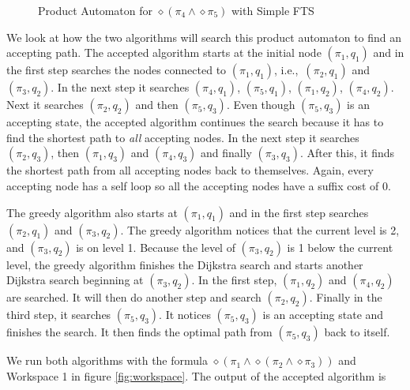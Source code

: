 \begin{figure}
\caption{Product Automaton for $\diamond (\pi_4 \wedge \diamond \pi_5)$ with Simple FTS}
\label{fig:Sequencing}
\end{figure}

We look at how the two algorithms will search this product automaton to find an accepting path. The accepted algorithm starts at the initial node $(\pi_1,q_1)$ and in the first step searches the nodes connected to $(\pi_1,q_1)$, i.e.,\ $(\pi_2,q_1)$ and $(\pi_3,q_2)$. In the next step it searches $(\pi_4,q_1)$, $(\pi_5,q_1)$, $(\pi_1,q_2)$, $(\pi_4,q_2)$. Next it searches $(\pi_2,q_2)$ and then $(\pi_5,q_3)$. Even though $(\pi_5,q_3)$ is an accepting state, the accepted algorithm continues the search because it has to find the shortest path to \textit{all} accepting nodes. In the next step it searches $(\pi_2,q_3)$, then $(\pi_1,q_3)$ and $(\pi_4,q_3)$ and finally $(\pi_3,q_3)$. After this, it finds the shortest path from all accepting nodes back to themselves. Again, every accepting node has a self loop so all the accepting nodes have a suffix cost of 0. 



The greedy algorithm also starts at $(\pi_1,q_1)$ and in the first step searches $(\pi_2,q_1)$ and $(\pi_3,q_2)$. The greedy algorithm notices that the current level is 2, and $(\pi_3,q_2)$ is on level 1. Because the level of $(\pi_3,q_2)$ is 1 below the current level, the greedy algorithm finishes the Dijkstra search and starts another Dijkstra search beginning at $(\pi_3,q_2)$. In the first step, $(\pi_1,q_2)$ and $(\pi_4,q_2)$ are searched. It will then do another step and search $(\pi_2,q_2)$. Finally in the third step, it searches $(\pi_5,q_3)$. It notices $(\pi_5,q_3)$ is an accepting state and finishes the search. It then finds the optimal path from $(\pi_5,q_3)$ back to itself.

We run both algorithms with the formula $\diamond (\pi_1 \land \diamond(\pi_2 \land \diamond \pi_3))$ and Workspace 1 in figure \ref{fig:workspace}. The output of the accepted algorithm is \\


